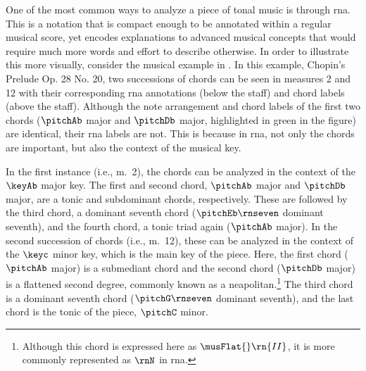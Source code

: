 
One of the most common ways to analyze a piece of tonal
music is through \gls{rna}. This is a notation that is
compact enough to be annotated within a regular musical
score, yet encodes explanations to advanced musical concepts
that would require much more words and effort to describe
otherwise. In order to illustrate this more visually,
consider the musical example in
. In this example, Chopin's
Prelude Op. 28 No. 20, two successions of chords can be seen
in measures 2 and 12 with their corresponding \gls{rna}
annotations (below the staff) and chord labels (above the
staff). Although the note arrangement and chord labels of
the first two chords ($\pitchAb$ major and $\pitchDb$ major,
highlighted in green in the figure) are identical, their
\gls{rna} labels are not. This is because in \gls{rna}, not
only the chords are important, but also the context of the
musical key.


In the first instance (i.e., m.~2), the chords can be
analyzed in the context of the $\keyAb$ major key. The first
and second chord, $\pitchAb$ major and $\pitchDb$ major, are
a tonic and subdominant chords, respectively. These are
followed by the third chord, a dominant seventh chord
($\pitchEb\rnseven$ dominant seventh), and the fourth chord,
a tonic triad again ($\pitchAb$ major). In the second
succession of chords (i.e., m.~12), these can be analyzed in
the context of the $\keyc$ minor key, which is the main key
of the piece. Here, the first chord ($\pitchAb$ major) is a
submediant chord and the second chord ($\pitchDb$ major) is
a flattened second degree, commonly known as a
\gls{neapolitan}.\footnote{Although this chord is expressed
here as $\musFlat{}\rn{II}$, it is more commonly represented
as $\rnN$ in \gls{rna}.} The third chord is a dominant
seventh chord ($\pitchG\rnseven$ dominant seventh), and the
last chord is the tonic of the piece, $\pitchC$ minor.

